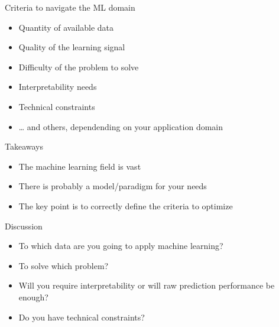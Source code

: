 \begin{frame}{Criteria to navigate the ML domain}
  \begin{itemize}[<+->]
  \item Quantity of available data
  \item Quality of the learning signal
  \item Difficulty of the problem to solve
  \item Interpretability needs
  \item Technical constraints
  \item … and others, dependending on your application domain
  \end{itemize}
\end{frame}

\begin{frame}{Takeaways}
  \begin{itemize}
  \item The machine learning field is vast
  \item There is probably a model/paradigm for your needs
  \item The key point is to correctly define the criteria to optimize
  \end{itemize}
\end{frame}

\begin{frame}{Discussion}
  \begin{itemize}
  \item To which data are you going to apply machine learning?
  \item To solve which problem?
  \item Will you require interpretability or will raw prediction performance be enough?
  \item Do you have technical constraints?
  \end{itemize}
\end{frame}
